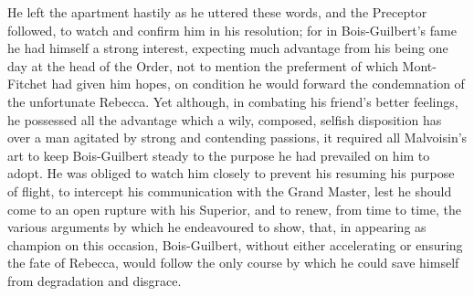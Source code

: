 He left the apartment hastily as he uttered these words, and the
Preceptor followed, to watch and confirm him in his resolution; for in
Bois-Guilbert's fame he had himself a strong interest, expecting much
advantage from his being one day at the head of the Order, not to
mention the preferment of which Mont-Fitchet had given him hopes, on
condition he would forward the condemnation of the unfortunate Rebecca.
Yet although, in combating his friend's better feelings, he possessed
all the advantage which a wily, composed, selfish disposition has over a
man agitated by strong and contending passions, it required all
Malvoisin's art to keep Bois-Guilbert steady to the purpose he had
prevailed on him to adopt. He was obliged to watch him closely to
prevent his resuming his purpose of flight, to intercept his
communication with the Grand Master, lest he should come to an open
rupture with his Superior, and to renew, from time to time, the various
arguments by which he endeavoured to show, that, in appearing as
champion on this occasion, Bois-Guilbert, without either accelerating or
ensuring the fate of Rebecca, would follow the only course by which he
could save himself from degradation and disgrace.
